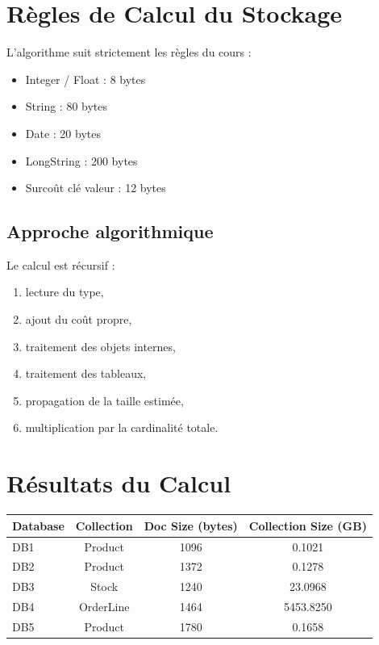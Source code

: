 \documentclass[12pt,a4paper]{article}
\begin{document}
\section{Règles de Calcul du Stockage}

L’algorithme suit strictement les règles du cours :

\begin{itemize}
    \item Integer / Float : 8 bytes
    \item String : 80 bytes
    \item Date : 20 bytes
    \item LongString : 200 bytes
    \item Surcoût clé   valeur : 12 bytes
\end{itemize}

\subsection*{Approche algorithmique}

Le calcul est récursif :
\begin{enumerate}
    \item lecture du type,
    \item ajout du coût propre,
    \item traitement des objets internes,
    \item traitement des tableaux,
    \item propagation de la taille estimée,
    \item multiplication par la cardinalité totale.
\end{enumerate}

\section{Résultats du Calcul}

\begin{center}
\begin{tabular}{lccc}
\toprule
\textbf{Database} & \textbf{Collection} & \textbf{Doc Size (bytes)} & \textbf{Collection Size (GB)} \\
\midrule
DB1 & Product & 1096 & 0.1021 \\
DB2 & Product & 1372 & 0.1278 \\
DB3 & Stock   & 1240 & 23.0968 \\
DB4 & OrderLine & 1464 & 5453.8250 \\
DB5 & Product & 1780 & 0.1658 \\
\bottomrule
\end{tabular}
\end{center}
\end{document}
